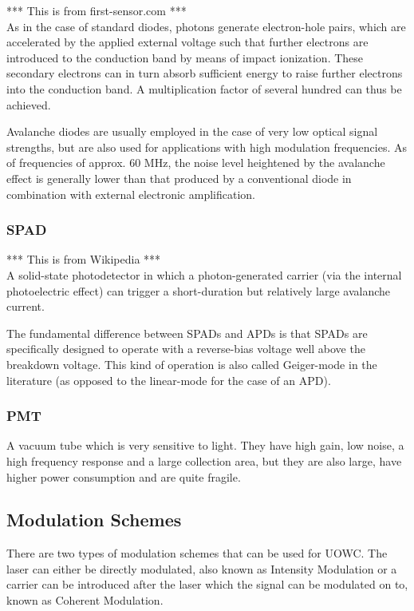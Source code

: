 \documentclass{article}
\begin{document}
*** This is from first-sensor.com *** \\
As in the case of standard diodes, photons generate electron-hole pairs, which are accelerated by the applied external voltage such that further electrons are introduced to the conduction band by means of impact ionization. These secondary electrons can in turn absorb sufficient energy to raise further electrons into the conduction band. A multiplication factor of several hundred can thus be achieved.

Avalanche diodes are usually employed in the case of very low optical signal strengths, but are also used for applications with high modulation frequencies. As of frequencies of approx. 60 MHz, the noise level heightened by the avalanche effect is generally lower than that produced by a conventional diode in combination with external electronic amplification.

\subsubsection{\ac{SPAD}}
*** This is from Wikipedia ***\\
A solid-state photodetector in which a photon-generated carrier (via the internal photoelectric effect) can trigger a short-duration but relatively large avalanche current.

The fundamental difference between SPADs and APDs is that SPADs are specifically designed to operate with a reverse-bias voltage well above the breakdown voltage. This kind of operation is also called Geiger-mode in the literature (as opposed to the linear-mode for the case of an APD).

\subsubsection{\ac{PMT}}
A vacuum tube which is very sensitive to light. They have high gain, low noise, a high frequency response and a large collection area, but they are also large, have higher power consumption and are quite fragile.

\subsection{Modulation Schemes}
There are two types of modulation schemes that can be used for \ac{UOWC}. The laser can either be directly modulated, also known as Intensity Modulation or a carrier can be introduced after the laser which the signal can be modulated on to, known as Coherent Modulation.
 
\end{document}
